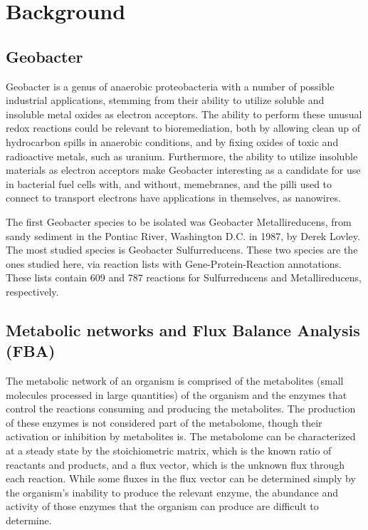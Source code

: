 \chapter{Background}
\section{Geobacter}
Geobacter is a genus of anaerobic proteobacteria with a number of possible industrial applications, stemming from their ability to utilize soluble and insoluble metal oxides as electron acceptors. 
The ability to perform these unusual redox reactions could be relevant to bioremediation, both by allowing clean up of hydrocarbon spills in anaerobic conditions, and by fixing oxides of toxic and radioactive metals, such as uranium. 
Furthermore, the ability to utilize insoluble materials as electron acceptors make Geobacter interesting as a candidate for use in bacterial fuel cells with, and without, memebranes, and the pilli used to connect to transport electrons have applications in themselves, as nanowires.

The first Geobacter species to be isolated was Geobacter Metallireducens, from sandy sediment in the Pontiac River, Washington D.C. in 1987, by Derek Lovley. 
The most studied species is Geobacter Sulfurreducens.
These two species are the ones studied here, via reaction lists with Gene-Protein-Reaction annotations.
These lists contain 609 and 787 reactions for Sulfurreducens and Metallireducens, respectively.

\section{Metabolic networks and Flux Balance Analysis (FBA)}
The metabolic network of an organism is comprised of the metabolites (small molecules processed in large quantities) of the organism and the enzymes that control the reactions consuming and producing the metabolites. 
The production of these enzymes is not considered part of the metabolome, though their activation or inhibition by metabolites is. 
The metabolome can be characterized at a steady state by the stoichiometric matrix, which is the known ratio of reactants and products, and a flux vector, which is the unknown flux through each reaction. 
While some fluxes in the flux vector can be determined simply by the organism's inability to produce the relevant enzyme, the abundance and activity of those enzymes that the organism can produce are difficult to determine. 

